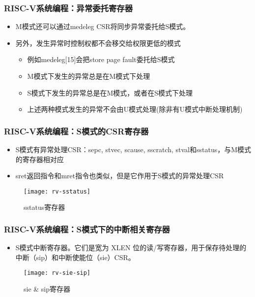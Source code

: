 
\begin{frame}
    \frametitle{RISC-V系统编程：异常委托寄存器}
    \begin{itemize}
        \item M模式还可以通过medeleg CSR将同步异常委托给S模式。
        \item 另外，发生异常时控制权都不会移交给权限更低的模式
        \begin{itemize}
            \item 例如medeleg[15]会把store page fault委托给S模式
            \item M模式下发生的异常总是在M模式下处理
            \item S模式下发生的异常总是在M模式，或者在S模式下处理
            \item 上述两种模式发生的异常不会由U模式处理(除非有U模式中断处理机制)
        \end{itemize}
        
    \end{itemize}
    
\end{frame}

\begin{frame}
    \frametitle{RISC-V系统编程：S模式的CSR寄存器}

    \begin{itemize}
        \item S模式有异常处理CSR：sepc, stvec, scause, sscratch, stval和sstatus，与M模式的寄存器相对应
        \item sret返回指令和mret指令也类似，但是它作用于S模式的异常处理CSR
        
    \end{itemize}
    
        \begin{figure}
    \centering
    \texttt{[image: rv-sstatus]}
            \caption{sstatus寄存器}
        \end{figure}
    
\end{frame}


\begin{frame}
    \frametitle{RISC-V系统编程：S模式下的中断相关寄存器}
    \begin{itemize}
        \item S模式中断寄存器。它们是宽为 XLEN 位的读/写寄存器，用于保存待处理的中断（sip）和中断使能位（sie）CSR。
    \end{itemize}   
    \begin{figure}
        \centering
        \texttt{[image: rv-sie-sip]}
        \caption{sie  \& sip寄存器}
    \end{figure}
\end{frame}

